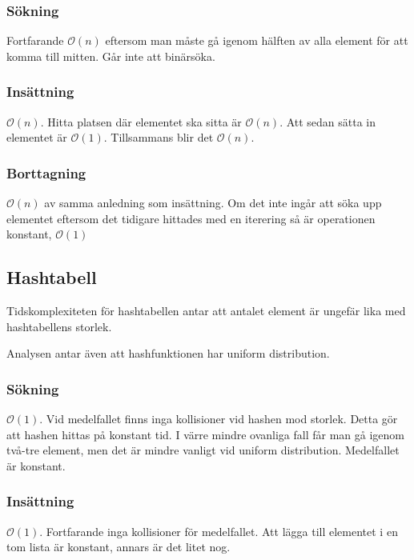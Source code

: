 \documentclass[a4paper,10pt,twoside]{article}
\newcommand{\Ordo}[1]{$\mathcal{O}(#1)$}
\begin{document}
		\subsubsection*{Sökning}

		Fortfarande \Ordo{n} eftersom man måste gå igenom hälften av alla element för att komma till mitten. Går inte att binärsöka.

		\subsubsection*{Insättning}

		\Ordo{n}. Hitta platsen där elementet ska sitta är \Ordo{n}. Att sedan sätta in elementet är \Ordo{1}. Tillsammans blir det \Ordo{n}.

		\subsubsection*{Borttagning}

		\Ordo{n} av samma anledning som insättning. Om det inte ingår att söka upp elementet eftersom det tidigare hittades med en iterering så är operationen konstant, \Ordo{1}

	\subsection{Hashtabell}

	Tidskomplexiteten för hashtabellen antar att antalet element är ungefär lika med hashtabellens storlek.

	Analysen antar även att hashfunktionen har uniform distribution.

		\subsubsection*{Sökning}

		\Ordo{1}. Vid medelfallet finns inga kollisioner vid hashen mod storlek. Detta gör att hashen hittas på konstant tid. I värre mindre ovanliga fall får man gå igenom två-tre element, men det är mindre vanligt vid uniform distribution. Medelfallet är konstant.

		\subsubsection*{Insättning}

		\Ordo{1}. Fortfarande inga kollisioner för medelfallet. Att lägga till elementet i en tom lista är konstant, annars är det litet nog.
\end{document}
